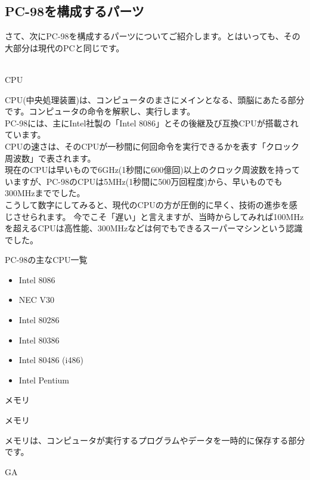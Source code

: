 \documentclass[b5paper,9pt,platex,dvipdfmx]{jsarticle}
\begin{document}
\begin{multicols*}{3}
\section[short]{PC-98を構成するパーツ}
さて、次にPC-98を構成するパーツについてご紹介します。とはいっても、その大部分は現代のPCと同じです。\\
\\
\begin{enumerate}
  {\bf  \item CPU\\}
CPU(中央処理装置)は、コンピュータのまさにメインとなる、頭脳にあたる部分です。コンピュータの命令を解釈し、実行します。\\
PC-98には、主にIntel社製の「Intel 8086」とその後継及び互換CPUが搭載されています。\\
CPUの速さは、そのCPUが一秒間に何回命令を実行できるかを表す「クロック周波数」で表されます。\\
現在のCPUは早いもので6GHz(1秒間に600億回)以上のクロック周波数を持っていますが、PC-98のCPUは5MHz(1秒間に500万回程度)から、早いものでも300MHzまででした。\\
こうして数字にしてみると、現代のCPUの方が圧倒的に早く、技術の進歩を感じさせられます。
今でこそ「遅い」と言えますが、当時からしてみれば100MHzを超えるCPUは高性能、300MHzなどは何でもできるスーパーマシンという認識でした。\\
\begin{itembox}[l]{PC-98の主なCPU一覧}
  \begin{itemize}
    \item Intel 8086
    \item NEC V30
    \item Intel 80286
    \item Intel 80386
    \item Intel 80486 (i486)
    \item Intel Pentium
  \end{itemize}
\end{itembox}
  {\bf  \item メモリ\\}
  {\bf  \item メモリ\\}
メモリは、コンピュータが実行するプログラムやデータを一時的に保存する部分です。\\
  {\bf  \item GA\\}
\end{enumerate}
\end{multicols*}
\end{document}
